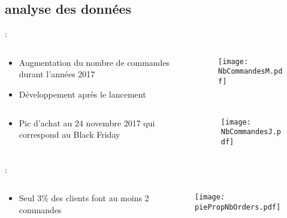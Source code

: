 \documentclass[8pt,aspectratio=169,hyperref={unicode=true}]{beamer}
\begin{document}
\subsection{analyse des données}
\begin{frame}{\insertsection: \insertsubsection}
    \begin{columns}
        \begin{column}{.5\textwidth}
            \begin{itemize}
                \item Augmentation du nombre de commandes durant l'années 2017
                \item Développement après le lancement
            \end{itemize}
        \end{column}
        \begin{column}{.5\textwidth}
            \begin{figure}
                \texttt{[image: NbCommandesM.pdf]}
            \end{figure}
        \end{column}
    \end{columns}
    \begin{columns}
        \begin{column}{.5\textwidth}
            \begin{itemize}
                \item Pic d'achat au 24 novembre 2017 qui correspond au Black Friday
            \end{itemize}
        \end{column}
        \begin{column}{.5\textwidth}
            \begin{figure}
                \texttt{[image: NbCommandesJ.pdf]}
            \end{figure}
        \end{column}
    \end{columns}
\end{frame}

\begin{frame}{\insertsection: \insertsubsection}
    \begin{columns}
        \begin{column}{.4\textwidth}
            \begin{itemize}
                \item Seul 3\% des clients font au moins 2 commandes
            \end{itemize}
        \end{column}
        \begin{column}{.6\textwidth}
            \begin{figure}
                \texttt{[image: piePropNbOrders.pdf]}
            \end{figure}
        \end{column}
    \end{columns}
\end{frame}
\end{document}
